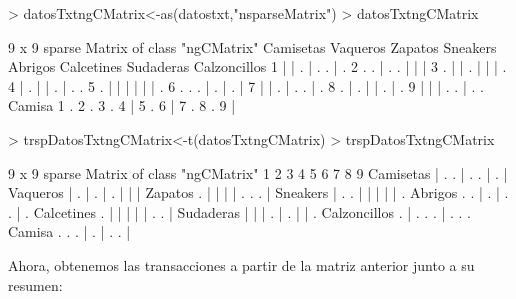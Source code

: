 \documentclass [a4paper] {article}
\begin{document}
\begin{Schunk}
\begin{Sinput}
> datosTxtngCMatrix<-as(datostxt,"nsparseMatrix")
> datosTxtngCMatrix
\end{Sinput}
\begin{Soutput}
9 x 9 sparse Matrix of class "ngCMatrix"
  Camisetas Vaqueros Zapatos Sneakers Abrigos Calcetines Sudaderas Calzoncillos
1         |        |       .        |       .          .         |            .
2         .        .       |        .       .          |         |            |
3         .        |       |        .       |          |         |            .
4         |        .       |        |       .          |         .            .
5         .        |       |        |       |          |         |            .
6         .        .       .        |       .          |         .            |
7         |        |       .        |       .          .         |            .
8         .        |       .        |       |          .         |            .
9         |        |       |        .       .          |         .            .
  Camisa
1      .
2      .
3      .
4      |
5      .
6      |
7      .
8      .
9      |
\end{Soutput}
\begin{Sinput}
> trspDatosTxtngCMatrix<-t(datosTxtngCMatrix)
> trspDatosTxtngCMatrix
\end{Sinput}
\begin{Soutput}
9 x 9 sparse Matrix of class "ngCMatrix"
             1 2 3 4 5 6 7 8 9
Camisetas    | . . | . . | . |
Vaqueros     | . | . | . | | |
Zapatos      . | | | | . . . |
Sneakers     | . . | | | | | .
Abrigos      . . | . | . . | .
Calcetines   . | | | | | . . |
Sudaderas    | | | . | . | | .
Calzoncillos . | . . . | . . .
Camisa       . . . | . | . . |
\end{Soutput}
\end{Schunk}

Ahora, obtenemos las transacciones a partir de la matriz anterior junto a su resumen:
\end{document}
